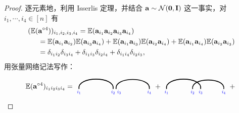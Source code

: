 \begin{enumerate}
\begin{theorem}
\begin{proof}
    逐元素地，利用 Isserlis
    定理，并结合 $\mathbf{a}\sim\mathcal{N}(\mathbf{0},\mathbf{I})$ 这一事实，对 $i_1,\cdots,i_4\in[n]$ 有
\begin{align*}
(\mathbb{E}(&\mathbf{a}^{\circ 4}))_{i_1,i_2,i_3,i_4} 
=
    \mathbb{E}(\mathbf{a}_{i_1}\mathbf{a}_{i_2}\mathbf{a}_{i_3}\mathbf{a}_{i_4})\\
&= 
    \mathbb{E}(\mathbf{a}_{i_1}\mathbf{a}_{i_2})\mathbb{E}(\mathbf{a}_{i_3}\mathbf{a}_{i_4}) + \mathbb{E}(\mathbf{a}_{i_1}\mathbf{a}_{i_3})\mathbb{E}(\mathbf{a}_{i_2}\mathbf{a}_{i_4})
    +\mathbb{E}(\mathbf{a}_{i_1}\mathbf{a}_{i_4})\mathbb{E}(\mathbf{a}_{i_2}\mathbf{a}_{i_3})\\
&=
    \delta_{i_1i_2}\delta_{i_3i_4} + \delta_{i_1i_3}\delta_{i_2i_4} + \delta_{i_1i_4}\delta_{i_2i_3},
\end{align*}
用张量网络记法写作：
\begin{align*}
\EE(\ab^{\outprod 4})_{i_1i_2i_3i_4}
=
\begin{tikzpicture}[baseline=\baseline]
    \tikzset{tensor/.style = {minimum size = 0.5cm,shape = circle,thick,draw=black,inner sep = 0pt}, edge/.style = {thick,line width=.4mm},every loop/.style={}}
    \def\y{0}
    \def\x{0}
    \draw[edge] (\x+0.15,\y-0.1) to [out=100,in=80] (\x+1.85,\y-0.1);
    \draw[edge] (\x+2,\y-0.1) to [out=100,in=80] (\x+3.65,\y-0.1);
    \node[draw=none] () at (\x+0.15,\y-0.25) {\scalebox{0.7}{\indcolor{$i_1$}}};
    \node[draw=none] () at (\x+1.85,\y-0.25) {\scalebox{0.7}{\indcolor{$i_2$}}};
    \node[draw=none] () at (\x+2.15,\y-0.25) {\scalebox{0.7}{\indcolor{$i_3$}}};
    \node[draw=none] () at (\x+3.65,\y-0.25) {\scalebox{0.7}{\indcolor{$i_4$}}};
\end{tikzpicture}
+
\begin{tikzpicture}[baseline=\baseline]
    \tikzset{tensor/.style = {minimum size = 0.5cm,shape = circle,thick,draw=black,inner sep = 0pt}, edge/.style = {thick,line width=.4mm},every loop/.style={}}
    \def\y{0}
    \def\x{0}
    \draw[edge] (\x+0.15,\y-0.1) to [out=100,in=80] (\x+1.85,\y-0.1);
    \draw[edge] (\x+1.45,\y-0.1) to [out=100,in=80] (\x+3,\y-0.1);
    \node[draw=none] () at (\x+0.15,\y-0.25) {\scalebox{0.7}{\indcolor{$i_1$}}};
    \node[draw=none] () at (\x+3,\y-0.25) {\scalebox{0.7}{\indcolor{$i_4$}}};
    \node[draw=none] () at (\x+1.85,\y-0.25) {\scalebox{0.7}{\indcolor{$i_3$}}};
    \node[draw=none] () at (\x+1.45,\y-0.25) {\scalebox{0.7}{\indcolor{$i_2$}}};
\end{tikzpicture}
+
    \begin{tikzpicture}[baseline=\baseline]
    \tikzset{tensor/.style = {minimum size = 0.5cm,shape = circle,thick,draw=black,inner sep = 0pt}, edge/.style = {thick,line width=.4mm},every loop/.style={}}

\end{tikzpicture}
\end{align*}
\end{proof}
\end{theorem}
\end{enumerate}
